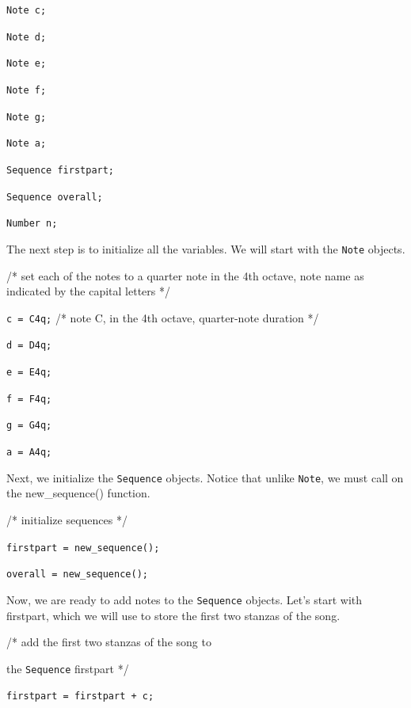 \documentclass[12pt,A4]{book}
\begin{document}
\verb|Note c;|

\verb|Note d;|

\verb|Note e;|

\verb|Note f;|

\verb|Note g;|

\verb|Note a;|

\verb|Sequence firstpart;|

\verb|Sequence overall;|

\verb|Number n;|

\vspace{5 mm}

\noindent The next step is to initialize all the variables. We will start with the \verb|Note| objects.

\vspace{5 mm}

/* set each of the notes to a quarter note in the 4th octave, note name as 
indicated by the capital letters */

	\verb|c = C4q;| /* note C, in the 4th octave, quarter-note duration */
	
	\verb|d = D4q;|
	
	\verb|e = E4q;|
	
	\verb|f = F4q;|
	
	\verb|g = G4q;|
	
	\verb|a = A4q;|

\vspace{5 mm}

\noindent Next, we initialize the \verb|Sequence| objects. Notice that unlike \verb|Note|, we must call on the new_sequence() function.

\vspace{5 mm}

	/* initialize sequences */
	
	\verb|firstpart = new_sequence();|
	
	\verb|overall = new_sequence();|

\vspace{5 mm}

\noindent Now, we are ready to add notes to the \verb|Sequence| objects. Let’s start with 
firstpart, which we will use to store the first two stanzas of the song.

\vspace{5 mm}

	/* add the first two stanzas of the song to 
	
	the \verb|Sequence| firstpart */
	
	\verb|firstpart = firstpart + c;|
	
\end{document}
